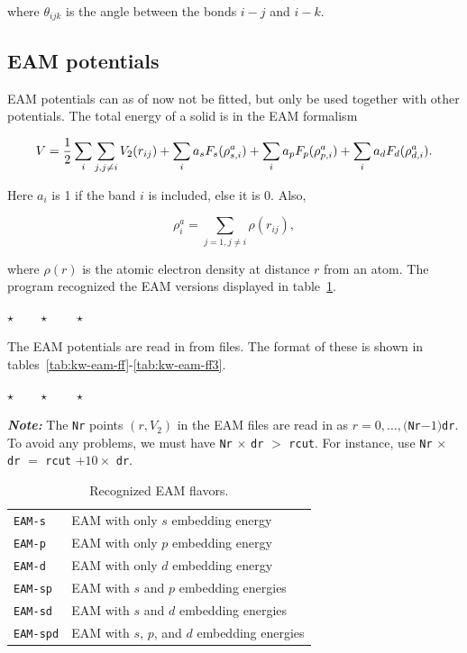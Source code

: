 \documentclass[a4paper,12pt,onecolumn]{article}
\newcommand{\stars}{\begin{center} \vspace{0.5cm}$\star \qquad \star \qquad \star$\vspace{0.5cm}\end{center}}
\begin{document}
where $\theta_{ijk}$ is the angle between the bonds $i-j$ and $i - k$.










\subsection{EAM potentials}

EAM potentials can as of now not be fitted, but only be used
together with other potentials. The total energy of a solid
is in the EAM formalism

\begin{equation}
V = {1 \over 2} \sum_i \sum_{j, j \neq i} V_2(r_{ij})
+ \sum_i a_s F_s(\rho^a_{s,i})
+ \sum_i a_p F_p(\rho^a_{p,i})
+ \sum_i a_d F_d(\rho^a_{d,i}).
\end{equation}

Here $a_i$ is 1 if the band $i$ is included, else it is 0.
Also,

\begin{equation}
\rho^a_i = \sum_{j=1, j\neq i} \rho(r_{ij}),
\end{equation}

where $\rho(r)$ is the atomic electron density at distance $r$
from an atom. The program recognized the EAM versions displayed
in table~\ref{tab:kw-eam}.

\stars



The EAM potentials are read in from files. The format of these
is shown in tables~\ref{tab:kw-eam-ff}-\ref{tab:kw-eam-ff3}.

\stars

{\large \textit{\textbf{Note:}}} The \verb+Nr+ points $(r, V_2)$
in the EAM files are read in as
$r = 0, \ldots,($\verb+Nr+$-1)$\verb+dr+.
To avoid any problems, we must have \verb+Nr+ $\times$ \verb+dr+ $>$ \verb+rcut+.
For instance, use 
\verb+Nr+ $\times$ \verb+dr+ $=$ \verb+rcut+ $+ 10 \times$ \verb+dr+.



\begin{table}[!h]
\caption{
Recognized EAM flavors.
\label{tab:kw-eam}
}
\begin{center}
\begin{tabular}{|l|l|}
\hline
\hline
\verb+EAM-s+         & EAM with only $s$ embedding energy \\
\verb+EAM-p+         & EAM with only $p$ embedding energy \\
\verb+EAM-d+         & EAM with only $d$ embedding energy \\
\verb+EAM-sp+        & EAM with $s$ and $p$ embedding energies \\
\verb+EAM-sd+        & EAM with $s$ and $d$ embedding energies \\
\verb+EAM-spd+       & EAM with $s$, $p$, and $d$ embedding energies \\
\hline
\hline
\end{tabular}
\end{center}
\end{table}
\end{document}
